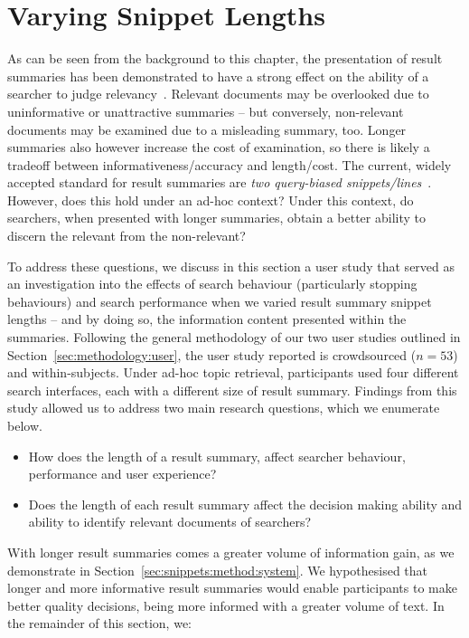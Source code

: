 \section{Varying Snippet Lengths}\label{chap:snippets:user}
As can be seen from the background to this chapter, the presentation of result summaries has been demonstrated to have a strong effect on the ability of a searcher to judge relevancy~\citep{he2012bridging}. Relevant documents may be overlooked due to uninformative or unattractive summaries -- but conversely, non-relevant documents may be examined due to a misleading summary, too. Longer summaries also however increase the cost of examination, so there is likely a tradeoff between informativeness/accuracy and length/cost. The current, widely accepted standard for result summaries are \emph{two query-biased snippets/lines}~\citep{hearst2009_search}. However, does this hold under an ad-hoc context? Under this context, do searchers, when presented with longer summaries, obtain a better ability to discern the relevant from the non-relevant?

To address these questions, we discuss in this section a user study that served as an investigation into the effects of search behaviour (particularly stopping behaviours) and search performance when we varied result summary snippet lengths -- and by doing so, the information content presented within the summaries. Following the general methodology of our two user studies outlined in Section~\ref{sec:methodology:user}, the user study reported is crowdsourced ($n=53$) and within-subjects. Under ad-hoc topic retrieval, participants used four different search interfaces, each with a different size of result summary. Findings from this study allowed us to address two main research questions, which we enumerate below.

\begin{itemize}
    \item{ How does the length of a result summary, affect searcher behaviour, performance and user experience?}
    \item{ Does the length of each result summary affect the decision making ability and ability to identify relevant documents of searchers?}
\end{itemize}

With longer result summaries comes a greater volume of information gain, as we demonstrate in Section~\ref{sec:snippets:method:system}. We hypothesised that longer and more informative result summaries would enable participants to make better quality decisions, being more informed with a greater volume of text. In the remainder of this section, we:

